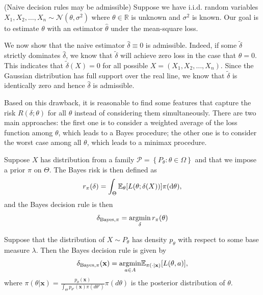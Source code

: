 \begin{eg}
    (Naive decision rules may be admissible) Suppose we have i.i.d. random variables $X_1, X_2, \ldots, X_n \sim \mathcal{N}\left(\theta, \sigma^2 \right)$ where $\theta\in \mathbb{R}$ is unknown and $\sigma^2$ is known. Our goal is to estimate $\theta$ with an estimator $\hat{\theta}$ under the mean-square loss. 

    We now show that the naive estimator $\hat{\delta}\equiv0$ is admissible. Indeed, if some $\tilde\delta$ strictly dominates $\hat{\delta}$, we know that $\tilde\delta$ will achieve zero loss in the case that $\theta=0$. This indicates that $\tilde\delta(X)=0$ for all possible $X=(X_1, X_2, \ldots, X_n)$. Since the Gaussian distribution has full support over the real line, we know that $\tilde\delta$ is identically zero and hence $\hat{\delta}$ is admissible.
\end{eg}


Based on this drawback, it is reasonable to find some features that capture the risk $R(\delta;\theta)$ for all $\theta$ instead of considering them simultaneously. There are two main approaches: the first one is to consider a weighted average of the loss function among $\theta$, which leads to a Bayes procedure; the other one is to consider the worst case among all $\theta$, which leads to a minimax procedure.

\begin{de}
     Suppose $X$ has distribution from a family $\mathcal{P}=\left\{P_\theta: \theta \in \Omega\right\}$ and that we impose a prior $\pi$ on $\Theta$. The Bayes risk is then defined as
     \[
     r_\pi(\delta)=\int_\Theta \E_\theta\brackets*{L(\theta;\delta(X))} \pi(\d \theta),
     \]
     and the Bayes decision rule is then
     \[
     \delta_{\operatorname{Bayes},\pi}=\operatornamewithlimits{argmin}_{\delta}  r_\pi(\theta)
     \]
\end{de}

\begin{prop}
    Suppose that the distribution of $X\sim P_\theta$ has density $p_\theta$ with respect to some base measure $\lambda$. Then the Bayes decision rule is given by
    $$\delta_{\text{Bayes},\pi}(\mathbf{x}) = \underset{a \in A}{\operatorname{argmin}} \mathbb{E}_{\pi(\cdot|\mathbf{x})}[L(\theta,a)],$$
where $\pi(\theta|\mathbf{x}) = \frac{p_{\theta}(\mathbf{x})}{\int_{\Theta} p_{\theta'}(\mathbf{x}) \pi(d\theta')}\pi(d\theta) $ is the posterior distribution of $\theta$.
\end{prop}

